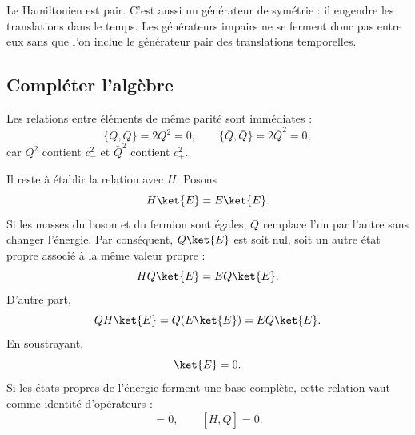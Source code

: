 Le Hamiltonien est pair. C’est aussi un générateur de symétrie : il engendre les translations dans le temps. Les générateurs impairs ne se ferment donc pas entre eux sans que l’on inclue le générateur pair des translations temporelles.

\begin{classroomqa}
\end{classroomqa}

\subsection{Compléter l’algèbre}

Les relations entre éléments de même parité sont immédiates :
\begin{equation}
\{Q,Q\}=2Q^2=0,
\qquad
\{\bar Q,\bar Q\}=2\bar Q^2=0,
\end{equation}
car \(Q^2\) contient \(c_-^2\) et \(\bar Q^2\) contient \(c_+^2\).

Il reste à établir la relation avec \(H\). Posons
\begin{equation}
H\ket{E}=E\ket{E}.
\end{equation}
Si les masses du boson et du fermion sont égales, \(Q\) remplace l’un par l’autre sans changer l’énergie. Par conséquent, \(Q\ket{E}\) est soit nul, soit un autre état propre associé à la même valeur propre :
\begin{equation}
H Q\ket{E}=E Q\ket{E}.
\end{equation}
D’autre part,
\begin{equation}
QH\ket{E}=Q(E\ket{E})=E Q\ket{E}.
\end{equation}
En soustrayant,
\begin{equation}
[H,Q]\ket{E}=0.
\end{equation}
Si les états propres de l’énergie forment une base complète, cette relation vaut comme identité d’opérateurs :
\begin{equation}
[H,Q]=0,
\qquad
[H,\bar Q]=0.
\end{equation}

\begin{classroomqa}
\end{classroomqa}

